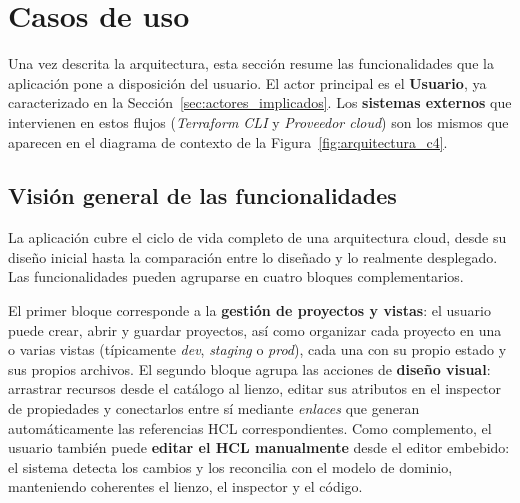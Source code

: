 \documentclass{article}
\begin{document}
    \newpage
    \section{Casos de uso}
    {
        \setlength{\parskip}{1em}
        \label{sec:casos_uso}

        \justify
        Una vez descrita la arquitectura, esta sección resume las funcionalidades
        que la aplicación pone a disposición del usuario. El actor principal es el \textbf{Usuario}, ya caracterizado en
        la Sección~\ref{sec:actores_implicados}. Los \textbf{sistemas externos}
        que intervienen en estos flujos (\textit{Terraform CLI} y
        \textit{Proveedor cloud}) son los mismos que aparecen en el diagrama de
        contexto de la Figura~\ref{fig:arquitectura_c4}.

        \subsection{Visión general de las funcionalidades}
        \justify
        La aplicación cubre el ciclo de vida completo de una arquitectura cloud,
        desde su diseño inicial hasta la comparación entre lo diseñado y lo
        realmente desplegado. Las funcionalidades pueden agruparse en cuatro
        bloques complementarios.

        \justify
        El primer bloque corresponde a la \textbf{gestión de proyectos y vistas}:
        el usuario puede crear, abrir y guardar proyectos, así como organizar
        cada proyecto en una o varias vistas (típicamente \textit{dev}, \textit{staging} o
        \textit{prod}), cada una con su propio estado y sus propios archivos. El segundo bloque agrupa las acciones de \textbf{diseño
        visual}: arrastrar recursos desde el catálogo al lienzo, editar sus
        atributos en el inspector de propiedades y conectarlos entre sí mediante
        \textit{enlaces} que generan automáticamente las referencias HCL
        correspondientes. Como
        complemento, el usuario también puede \textbf{editar el HCL
        manualmente} desde el editor embebido: el sistema detecta los cambios y
        los reconcilia con el modelo de dominio, manteniendo coherentes el
        lienzo, el inspector y el código.

}
\end{document}
